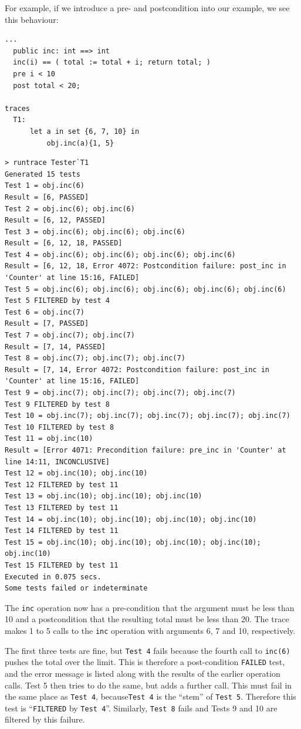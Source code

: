 \documentclass{overturerepchap}
\begin{document}
For example, if we introduce a pre- and postcondition into our example, we see
this behaviour:

\small
\begin{lstlisting}
...
  public inc: int ==> int
  inc(i) == ( total := total + i; return total; )
  pre i < 10
  post total < 20;

traces
  T1:
      let a in set {6, 7, 10} in
          obj.inc(a){1, 5}
\end{lstlisting}

\scriptsize
\lstset{style=tool,language=}
\begin{lstlisting}[escapechar=@]
> runtrace Tester`T1
Generated 15 tests
Test 1 = obj.inc(6)
Result = [6, PASSED]
Test 2 = obj.inc(6); obj.inc(6)
Result = [6, 12, PASSED]
Test 3 = obj.inc(6); obj.inc(6); obj.inc(6)
Result = [6, 12, 18, PASSED]
Test 4 = obj.inc(6); obj.inc(6); obj.inc(6); obj.inc(6)
Result = [6, 12, 18, Error 4072: Postcondition failure: post_inc in 'Counter' at line 15:16, FAILED]
Test 5 = obj.inc(6); obj.inc(6); obj.inc(6); obj.inc(6); obj.inc(6)
Test 5 FILTERED by test 4
Test 6 = obj.inc(7)
Result = [7, PASSED]
Test 7 = obj.inc(7); obj.inc(7)
Result = [7, 14, PASSED]
Test 8 = obj.inc(7); obj.inc(7); obj.inc(7)
Result = [7, 14, Error 4072: Postcondition failure: post_inc in 'Counter' at line 15:16, FAILED]
Test 9 = obj.inc(7); obj.inc(7); obj.inc(7); obj.inc(7)
Test 9 FILTERED by test 8
Test 10 = obj.inc(7); obj.inc(7); obj.inc(7); obj.inc(7); obj.inc(7)
Test 10 FILTERED by test 8
Test 11 = obj.inc(10)
Result = [Error 4071: Precondition failure: pre_inc in 'Counter' at line 14:11, INCONCLUSIVE]
Test 12 = obj.inc(10); obj.inc(10)
Test 12 FILTERED by test 11
Test 13 = obj.inc(10); obj.inc(10); obj.inc(10)
Test 13 FILTERED by test 11
Test 14 = obj.inc(10); obj.inc(10); obj.inc(10); obj.inc(10)
Test 14 FILTERED by test 11
Test 15 = obj.inc(10); obj.inc(10); obj.inc(10); obj.inc(10); obj.inc(10)
Test 15 FILTERED by test 11
Executed in 0.075 secs. 
Some tests failed or indeterminate
\end{lstlisting}
\lstset{style=mystyle}
\lstset{language=VDM++}
\normalsize

The \texttt{inc} operation now has a pre-condition that the argument must be
less than 10 and a postcondition that the resulting total must be less than 20.
The trace makes 1 to 5 calls to the \texttt{inc} operation with arguments 6, 7
and 10, respectively.

The first three tests are fine, but \texttt{Test 4} fails because the fourth call to
\texttt{inc(6)} pushes the total over the limit. This is therefore a
post-condition \texttt{FAILED} test, and the error message is listed along with the
results of the earlier operation calls. Test 5 then tries to do the same, but
adds a further call. This must fail in the same place as \texttt{Test 4}, because\texttt{Test 4}
is the ``stem'' of \texttt{Test 5}. Therefore this test is ``\texttt{FILTERED} by \texttt{Test 4}''.
Similarly, \texttt{Test 8} fails and Tests 9 and 10 are filtered by this failure.
\end{document}
